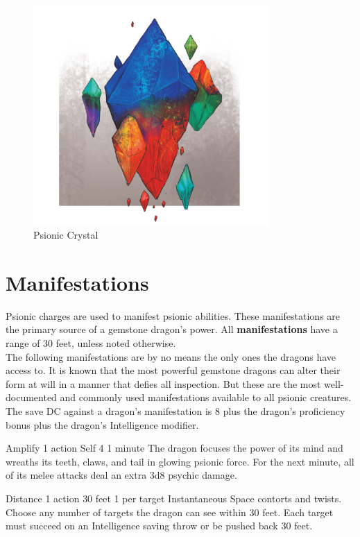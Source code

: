 \documentclass[letterpaper,twocolumn,openany]{dndbook}
\begin{document}
\begin{figure}
    \includegraphics[width=9cm]{images/psionic_crystal.png}
    \caption{Psionic Crystal}
\end{figure}

\section{Manifestations}
Psionic charges are used to manifest psionic abilities. These manifestations are the primary source of a gemstone dragon’s power. All \textbf{manifestations} have a range of 30 feet, unless noted otherwise.\\
The following manifestations are by no means the only ones the dragons have access to. It is known that the most powerful gemstone dragons can alter their form at will in a manner that defies all inspection. But these are the most well-documented and commonly used manifestations available to all psionic creatures.\\
The save DC against a dragon’s manifestation is 8 plus the dragon’s proficiency bonus plus the dragon’s Intelligence modifier.

\DndPsiHeader
  {Amplify}
  {}
  {1 action}
  {Self}
  {4}
  {1 minute}
The dragon focuses the power of its mind and wreaths its teeth, claws, and tail in glowing psionic force. For the next minute, all of its melee attacks deal an extra 3d8 psychic damage.

\DndPsiHeader
  {Distance}
  {}
  {1 action}
  {30 feet}
  {1 per target}
  {Instantaneous}
  Space contorts and twists. Choose any number of targets the dragon can see within 30 feet. Each target must succeed on an Intelligence saving throw or be pushed back 30 feet.
\end{document}
